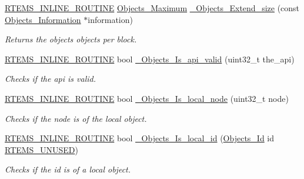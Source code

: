 \begin{DoxyCompactItemize}
\mbox{\hyperlink{group__RTEMSScoreBaseDefs_gac216239df231d5dbd15e3520b0b9313f}{R\+T\+E\+M\+S\+\_\+\+I\+N\+L\+I\+N\+E\+\_\+\+R\+O\+U\+T\+I\+NE}} \mbox{\hyperlink{group__RTEMSScoreObject_gaa2735357885ec7d7157c32f3f835f9ae}{Objects\+\_\+\+Maximum}} \mbox{\hyperlink{group__RTEMSScoreObject_gaa9ed61a9bb7d4a1782461c7b7b1e8b07}{\+\_\+\+Objects\+\_\+\+Extend\+\_\+size}} (const \mbox{\hyperlink{structObjects__Information}{Objects\+\_\+\+Information}} $\ast$information)
\begin{DoxyCompactList}\small\item\em Returns the object\textquotesingle{}s objects per block. \end{DoxyCompactList}\item 
\mbox{\hyperlink{group__RTEMSScoreBaseDefs_gac216239df231d5dbd15e3520b0b9313f}{R\+T\+E\+M\+S\+\_\+\+I\+N\+L\+I\+N\+E\+\_\+\+R\+O\+U\+T\+I\+NE}} bool \mbox{\hyperlink{group__RTEMSScoreObject_ga8014a70deeb6819f7e2ca50efd13e1be}{\+\_\+\+Objects\+\_\+\+Is\+\_\+api\+\_\+valid}} (uint32\+\_\+t the\+\_\+api)
\begin{DoxyCompactList}\small\item\em Checks if the api is valid. \end{DoxyCompactList}\item 
\mbox{\hyperlink{group__RTEMSScoreBaseDefs_gac216239df231d5dbd15e3520b0b9313f}{R\+T\+E\+M\+S\+\_\+\+I\+N\+L\+I\+N\+E\+\_\+\+R\+O\+U\+T\+I\+NE}} bool \mbox{\hyperlink{group__RTEMSScoreObject_ga808f79623f447af88d2f84f211fd9139}{\+\_\+\+Objects\+\_\+\+Is\+\_\+local\+\_\+node}} (uint32\+\_\+t node)
\begin{DoxyCompactList}\small\item\em Checks if the node is of the local object. \end{DoxyCompactList}\item 
\mbox{\hyperlink{group__RTEMSScoreBaseDefs_gac216239df231d5dbd15e3520b0b9313f}{R\+T\+E\+M\+S\+\_\+\+I\+N\+L\+I\+N\+E\+\_\+\+R\+O\+U\+T\+I\+NE}} bool \mbox{\hyperlink{group__RTEMSScoreObject_gac7e6cf1ee2d115abb4d53efc9ba2bca0}{\+\_\+\+Objects\+\_\+\+Is\+\_\+local\+\_\+id}} (\mbox{\hyperlink{group__RTEMSScoreObject_ga5821f52a51072941bdd603e542d0863e}{Objects\+\_\+\+Id}} id \mbox{\hyperlink{group__RTEMSScoreBaseDefs_ga6794c0ff237a90e837e19f9bbcae4297}{R\+T\+E\+M\+S\+\_\+\+U\+N\+U\+S\+ED}})
\begin{DoxyCompactList}\small\item\em Checks if the id is of a local object. \end{DoxyCompactList}\item 

\end{DoxyCompactItemize}
